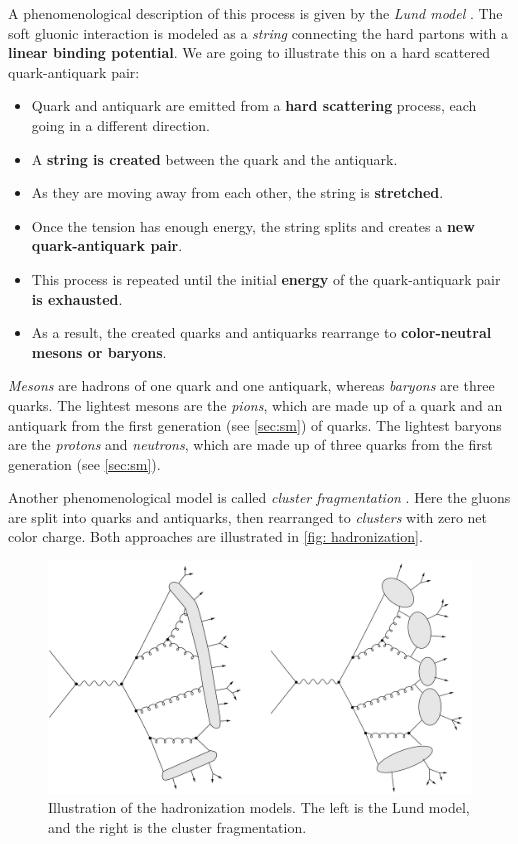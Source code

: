 A phenomenological description of this process is given by the \emph{Lund model} \cite{lund}.
The soft gluonic interaction is modeled as a \emph{string} connecting the hard partons with a \textbf{linear binding potential}.
We are going to illustrate this on a hard scattered quark-antiquark pair:
\begin{itemize}
    \item Quark and antiquark are emitted from a \textbf{hard scattering} process, each going in a different direction.
    \item A \textbf{string is created} between the quark and the antiquark.
    \item As they are moving away from each other, the string is \textbf{stretched}.
    \item Once the tension has enough energy, the string splits and creates a \textbf{new quark-antiquark pair}.
    \item This process is repeated until the initial \textbf{energy} of the quark-antiquark pair \textbf{is exhausted}.
    \item As a result, the created quarks and antiquarks rearrange to \textbf{color-neutral mesons or baryons}.
\end{itemize}
\emph{Mesons} are hadrons of one quark and one antiquark, whereas \emph{baryons} are three quarks.
The lightest mesons are the \emph{pions}, which are made up of a quark and an antiquark from the first generation (see \cref{sec:sm}) of quarks.
The lightest baryons are the \emph{protons} and \emph{neutrons}, which are made up of three quarks from the first generation (see \cref{sec:sm}).

Another phenomenological model is called \emph{cluster fragmentation} \cite{cluster_frag}.
Here the gluons are split into quarks and antiquarks, then rearranged to \emph{clusters} with zero net color charge.
Both approaches are illustrated in \cref{fig: hadronization}.
\begin{figure}[htb]
    \centering
    \includegraphics[width=0.5\linewidth]{src/img/hadronization.png}
    \caption[Illustration of the hadronization models. The left is the Lund model, and the right is the cluster fragmentation.]{Illustration of the hadronization models. The left is the Lund model, and the right is the cluster fragmentation. \footnotemark}
    \label{fig:hadronization}
\end{figure}

